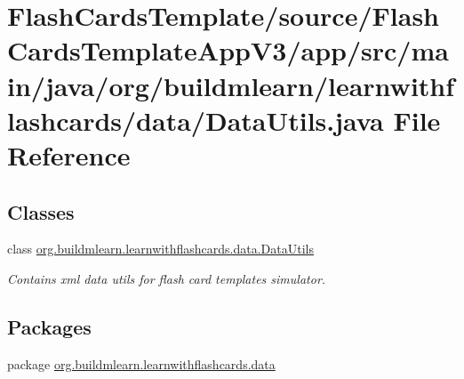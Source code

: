\hypertarget{FlashCardsTemplate_2source_2FlashCardsTemplateAppV3_2app_2src_2main_2java_2org_2buildmlearn_2lead72dd80b0dee0cb1129f55d2c9ae1e8a}{}\section{Flash\+Cards\+Template/source/\+Flash\+Cards\+Template\+App\+V3/app/src/main/java/org/buildmlearn/learnwithflashcards/data/\+Data\+Utils.java File Reference}
\label{FlashCardsTemplate_2source_2FlashCardsTemplateAppV3_2app_2src_2main_2java_2org_2buildmlearn_2lead72dd80b0dee0cb1129f55d2c9ae1e8a}
\subsection*{Classes}
\begin{DoxyCompactItemize}
\item 
class \hyperlink{classorg_1_1buildmlearn_1_1learnwithflashcards_1_1data_1_1DataUtils}{org.\+buildmlearn.\+learnwithflashcards.\+data.\+Data\+Utils}
\begin{DoxyCompactList}\small\item\em Contains xml data utils for flash card template\textquotesingle{}s simulator. \end{DoxyCompactList}\end{DoxyCompactItemize}
\subsection*{Packages}
\begin{DoxyCompactItemize}
\item 
package \hyperlink{namespaceorg_1_1buildmlearn_1_1learnwithflashcards_1_1data}{org.\+buildmlearn.\+learnwithflashcards.\+data}
\end{DoxyCompactItemize}
